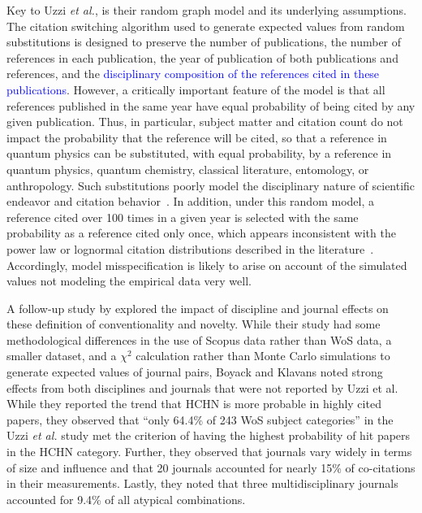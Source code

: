 \documentclass[NETN]{stjour}
\begin{document}
Key to Uzzi {\em et al.}, is their random graph model and its underlying assumptions. The citation switching algorithm used to generate expected values from random substitutions is designed to preserve the number of publications, the number of references in each publication, the year of publication of both publications and references, and the \textcolor{blue}{disciplinary composition of the references cited in these publications}. However, a critically important feature of the model is that all references published in the same year have equal probability of being cited by any given publication.
Thus, in particular,  subject matter and  citation count do not impact the probability that the reference will be cited, so that  a reference in quantum physics can be substituted, with equal probability, by a reference in quantum physics, quantum chemistry, classical literature, entomology, or anthropology. Such substitutions poorly model the disciplinary nature of scientific endeavor and citation behavior~\citep{wallace_lariviere_gingras_2012,moed_measuring_2010,klavans_research_2017,garfield_1979}. In addition, under this random model, a reference cited over 100 times in a given year is selected with the same probability as a reference cited only once, which appears inconsistent with the power law or lognormal citation distributions described in the literature~\citep{stringer_statistical_2010,perline_strong_2005}.  Accordingly, model misspecification is likely to arise on account of the simulated values not modeling the empirical data very well. 

A follow-up study by \cite{boyack_vs_uzzi_2014} explored the impact of discipline and journal effects on these definition of conventionality and novelty.  While their study had some methodological differences in the use of Scopus data rather than WoS data, a smaller dataset, and a $\chi^2$ calculation rather than Monte Carlo simulations to generate expected values of journal pairs, Boyack and Klavans noted strong effects from both disciplines and journals that were not reported by Uzzi et al. While they reported the trend that HCHN is more probable in highly cited papers, they observed that ``only 64.4\%  of  243  WoS  subject  categories'' in the Uzzi {\em et al.} study met the criterion of having the highest probability of hit papers in the HCHN category.  Further, they observed that journals vary widely in terms of size and influence and that 20 journals accounted for nearly 15\% of co-citations in their measurements. Lastly, they noted that three multidisciplinary journals accounted for 9.4\% of all atypical combinations. 
\end{document}
